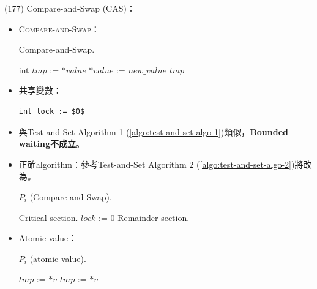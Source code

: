 \begin{theorem}{(177)} Compare-and-Swap (CAS)：\begin{itemize}
        \item \textsc{Compare-and-Swap}：
        \begin{algorithm}[H]
            \caption{Compare-and-Swap.}
            \begin{algorithmic}[1]
                 
                    \State int $tmp$ := $*value$
                        \State $*value$ := $new\_value$
                    \EndIf
                    \State \Return $tmp$
                \EndFunction
            \end{algorithmic}
        \end{algorithm}
        \item 共享變數：\begin{lstlisting}[caption={Shared variables of Algorithm 1 (\textsc{Compare-and-Swap}).}, captionpos=b, mathescape=true]
            int lock := $0$
        \end{lstlisting}
        \item 與Test-and-Set Algorithm 1 (\ref{algo:test-and-set-algo-1})類似，\textbf{Bounded waiting不成立}。
        \item 正確algorithm\label{algo:comp-and-swap}：參考Test-and-Set Algorithm 2 (\ref{algo:test-and-set-algo-2})將改為。
        \begin{algorithm}[H]
            \caption{$P_i$ (Compare-and-Swap).}
            \begin{algorithmic}[1]
                    \Repeat
                        \EndWhile
                        \State Critical section.
                        \State $lock$ := $0$
                        \State Remainder section.
                \EndFunction
            \end{algorithmic}
        \end{algorithm}
        \item Atomic value：
        \begin{algorithm}[H]
            \caption{$P_i$ (atomic value).}
            \begin{algorithmic}[1]
                    \State $tmp$ := $*v$
                        \State $tmp$ := $*v$
                    \EndWhile
                \EndFunction
            \end{algorithmic}
        \end{algorithm}
    \end{itemize}
\end{theorem}


